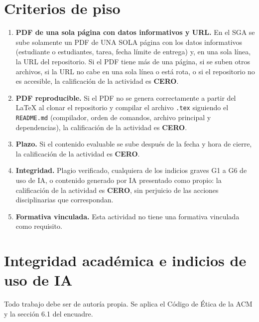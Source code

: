 \documentclass[11pt]{article}
\newcommand{\seccion}[1]{\section{\textcolor{utegreendk}{#1}}}
\begin{document}
\seccion{Criterios de piso}

\begin{cajapiso}[title={Criterios de piso: su incumplimiento implica calificación CERO en la actividad}]
	\begin{enumerate}[label=\textbf{P\arabic*.},leftmargin=24pt,itemsep=3pt]
		\item \textbf{PDF de una sola página con datos informativos y URL.} En el SGA se sube solamente un PDF de UNA SOLA página con los datos informativos (estudiante o estudiantes, tarea, fecha límite de entrega) y, en una sola línea, la URL del repositorio. Si el PDF tiene más de una página, si se suben otros archivos, si la URL no cabe en una sola línea o está rota, o si el repositorio no es accesible, la calificación de la actividad es \textbf{CERO}.
		\item \textbf{PDF reproducible.} Si el PDF no se genera correctamente a partir del \LaTeX{} al clonar el repositorio y compilar el archivo \texttt{.tex} siguiendo el \texttt{README.md} (compilador, orden de comandos, archivo principal y dependencias), la calificación de la actividad es \textbf{CERO}.
		\item \textbf{Plazo.} Si el contenido evaluable se sube después de la fecha y hora de cierre, la calificación de la actividad es \textbf{CERO}.
		\item \textbf{Integridad.} Plagio verificado, cualquiera de los indicios graves G1 a G6 de uso de IA, o contenido generado por IA presentado como propio: la calificación de la actividad es \textbf{CERO}, sin perjuicio de las acciones disciplinarias que correspondan.
		\item \textbf{Formativa vinculada.} Esta actividad no tiene una formativa vinculada como requisito.
	\end{enumerate}
\end{cajapiso}

\seccion{Integridad académica e indicios de uso de IA}

Todo trabajo debe ser de autoría propia. Se aplica el Código de Ética de la ACM \citep{acm_code_2018} y la sección 6.1 del encuadre.
\end{document}
